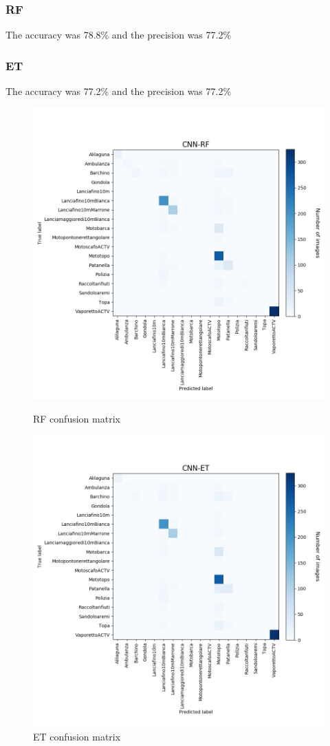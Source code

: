 \documentclass[12pt]{article}
\begin{document}
\subsubsection{RF}
The accuracy was 78.8\% and the precision was 77.2\%
\subsubsection{ET}
The accuracy was 77.2\% and the precision was 77.2\%

\begin{figure}[!ht]
	\centering
	\begin{minipage}{.5\textwidth}
		\centering
		\includegraphics[width=.8\linewidth]{../code/output/CNN-RF.png}
		\caption{RF confusion matrix} %
		\label{fig:cnf_rf}
	\end{minipage}%
	\begin{minipage}{.5\textwidth}
		\centering
		\includegraphics[width=.8\linewidth]{../code/output/CNN-ET.png}
		\caption{ET confusion matrix} %
		\label{fig:cnf_et}
	\end{minipage}
\end{figure}
\end{document}
